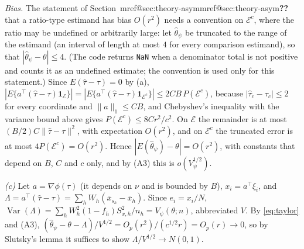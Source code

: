 \documentclass[pdflatex,sn-mathphys-num,iicol]{sn-jnl}
\makeatletter
\theoremstyle{thmstyleone}
\theoremstyle{thmstyletwo}
\theoremstyle{thmstylethree}
\newcommand{\Mref}[1]{\ifcsname mref@#1\endcsname\csname mref@#1\endcsname\else\textbf{??}\fi}
\makeatother
\begin{document}
\emph{Bias.} The statement of Section~\Mref{sec:theory-asym} that a ratio-type estimand has bias $O(r^2)$ needs a convention on $\mathcal E^c$, where the ratio may be undefined or
arbitrarily large: let $\hat\theta_\psi$ be truncated to the range of the estimand (an interval of length at most $4$ for every comparison estimand), so that $|\hat\theta_\psi-\theta|\le4$. (The code returns \texttt{NaN} when a
denominator total is not positive and counts it as an undefined estimate; the convention is used only for this statement.) Since $E(\hat\tau-\tau)=0$ by (a),
$|E\{a^\top(\hat\tau-\tau)\mathbf 1_{\mathcal E}\}|=|E\{a^\top(\hat\tau-\tau)\mathbf 1_{\mathcal E^c}\}|\le2CB\,P(\mathcal E^c)$, because $|\hat\tau_c-\tau_c|\le2$ for every coordinate and $\|a\|_1\le CB$,
and Chebyshev's inequality with the variance bound above gives $P(\mathcal E^c)\le8Cr^2/c^2$. On $\mathcal E$ the remainder is at most $(B/2)C\|\hat\tau-\tau\|^2$, with expectation $O(r^2)$, and on $\mathcal E^c$ the
truncated error is at most $4P(\mathcal E^c)=O(r^2)$. Hence $|E(\hat\theta_\psi)-\theta|=O(r^2)$, with constants that depend on $B$, $C$ and $c$ only, and by (A3) this is $o(V_\psi^{1/2})$.

\emph{(c)} Let $a=\nabla\phi(\tau)$ (it depends on $\nu$ and is bounded by $B$), $x_i=a^\top\xi_i$,
and $\Lambda=a^\top(\hat\tau-\tau)=\sum_hW_h(\bar x_{s_h}-\bar x_h)$. Since $e_i=x_i/N$,
$\operatorname{Var}(\Lambda)=\sum_hW_h^2(1-f_h)S^2_{x,h}/n_h=V_\psi(\theta;n)$, abbreviated $V$. By
\eqref{eq:taylor} and (A3), $(\hat\theta_\psi-\theta-\Lambda)/V^{1/2}=O_p(r^2)/(c^{1/2}r)=O_p(r)\to0$,
so by Slutsky's lemma it suffices to show $\Lambda/V^{1/2}\to N(0,1)$.
\end{document}
